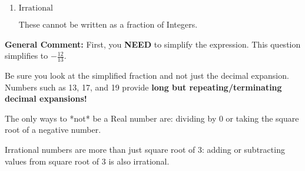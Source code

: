 \documentclass{extbook}[14pt]
\begin{document}
\begin{enumerate}
{\begin{enumerate}[label=\Alph*.]
These are Nonreal Complex numbers \textbf{OR} things that are not numbers (e.g., dividing by 0).
\item \( \text{Irrational} \)

These cannot be written as a fraction of Integers.
\end{enumerate}

\textbf{General Comment:} First, you \textbf{NEED} to simplify the expression. This question simplifies to $-\frac{12}{13}$. 
 
 Be sure you look at the simplified fraction and not just the decimal expansion. Numbers such as 13, 17, and 19 provide \textbf{long but repeating/terminating decimal expansions!} 
 
 The only ways to *not* be a Real number are: dividing by 0 or taking the square root of a negative number. 
 
 Irrational numbers are more than just square root of 3: adding or subtracting values from square root of 3 is also irrational.
}
\end{enumerate}
\end{document}
